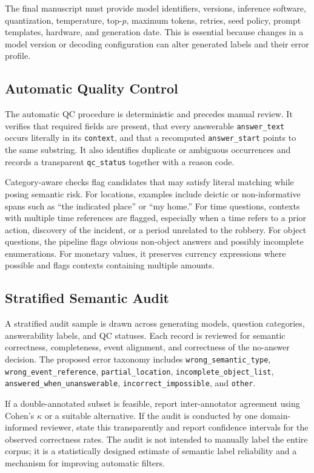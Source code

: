 \documentclass[graybox]{SNmult}
\begin{document}
The final manuscript must provide model identifiers, versions, inference software, quantization, temperature, top-$p$, maximum tokens, retries, seed policy, prompt templates, hardware, and generation date. This is essential because changes in a model version or decoding configuration can alter generated labels and their error profile.

\subsection{Automatic Quality Control}

The automatic QC procedure is deterministic and precedes manual review. It verifies that required fields are present, that every answerable \texttt{answer\_text} occurs literally in its \texttt{context}, and that a recomputed \texttt{answer\_start} points to the same substring. It also identifies duplicate or ambiguous occurrences and records a transparent \texttt{qc\_status} together with a reason code.

Category-aware checks flag candidates that may satisfy literal matching while posing semantic risk. For locations, examples include deictic or non-informative spans such as ``the indicated place'' or ``my home.'' For time questions, contexts with multiple time references are flagged, especially when a time refers to a prior action, discovery of the incident, or a period unrelated to the robbery. For object questions, the pipeline flags obvious non-object answers and possibly incomplete enumerations. For monetary values, it preserves currency expressions where possible and flags contexts containing multiple amounts.

\subsection{Stratified Semantic Audit}

A stratified audit sample is drawn across generating models, question categories, answerability labels, and QC statuses. Each record is reviewed for semantic correctness, completeness, event alignment, and correctness of the no-answer decision. The proposed error taxonomy includes \texttt{wrong\_semantic\_type}, \texttt{wrong\_event\_reference}, \texttt{partial\_location}, \texttt{incomplete\_object\_list}, \texttt{answered\_when\_unanswerable}, \texttt{incorrect\_impossible}, and \texttt{other}.

If a double-annotated subset is feasible, report inter-annotator agreement using Cohen's $\kappa$ or a suitable alternative. If the audit is conducted by one domain-informed reviewer, state this transparently and report confidence intervals for the observed correctness rates. The audit is not intended to manually label the entire corpus; it is a statistically designed estimate of semantic label reliability and a mechanism for improving automatic filters.
\end{document}
